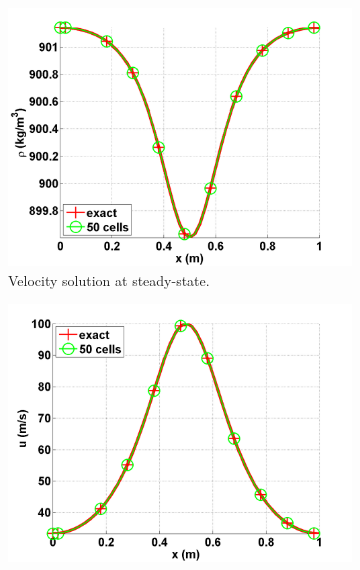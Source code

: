 \begin{figure}[H]
        \centering
        \begin{subfigure}[b]{0.495\textwidth}
                \centering
                \includegraphics[scale=.50]{figures/liquid_velocity_numerical_and_exact_50.png}
                \caption{Velocity solution at steady-state.}
                \label{fig:1d_nozzle_liq_vel}
        \end{subfigure}%
        \begin{subfigure}[b]{0.495\textwidth}
                \centering
                \includegraphics[scale=.50]{figures/liquid_density_numerical_and_exact_50.png}

\end{subfigure}
\end{figure}
